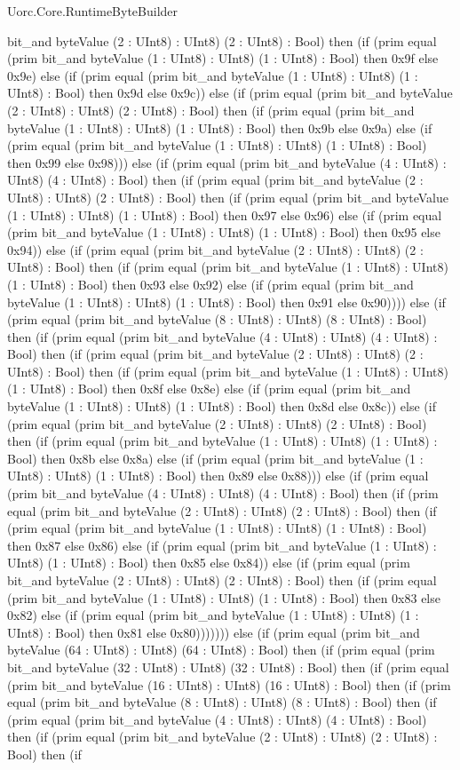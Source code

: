 \begin{lexlean}{Uorc.Core.RuntimeByteBuilder}
\begin{semanticmodule}
{bit_and byteValue (2 : UInt8) : UInt8) (2 : UInt8) : Bool) then (if (prim equal (prim bit_and byteValue (1 : UInt8) : UInt8) (1 : UInt8) : Bool) then 0x9f else 0x9e) else (if (prim equal (prim bit_and byteValue (1 : UInt8) : UInt8) (1 : UInt8) : Bool) then 0x9d else 0x9c)) else (if (prim equal (prim bit_and byteValue (2 : UInt8) : UInt8) (2 : UInt8) : Bool) then (if (prim equal (prim bit_and byteValue (1 : UInt8) : UInt8) (1 : UInt8) : Bool) then 0x9b else 0x9a) else (if (prim equal (prim bit_and byteValue (1 : UInt8) : UInt8) (1 : UInt8) : Bool) then 0x99 else 0x98))) else (if (prim equal (prim bit_and byteValue (4 : UInt8) : UInt8) (4 : UInt8) : Bool) then (if (prim equal (prim bit_and byteValue (2 : UInt8) : UInt8) (2 : UInt8) : Bool) then (if (prim equal (prim bit_and byteValue (1 : UInt8) : UInt8) (1 : UInt8) : Bool) then 0x97 else 0x96) else (if (prim equal (prim bit_and byteValue (1 : UInt8) : UInt8) (1 : UInt8) : Bool) then 0x95 else 0x94)) else (if (prim equal (prim bit_and byteValue (2 : UInt8) : UInt8) (2 : UInt8) : Bool) then (if (prim equal (prim bit_and byteValue (1 : UInt8) : UInt8) (1 : UInt8) : Bool) then 0x93 else 0x92) else (if (prim equal (prim bit_and byteValue (1 : UInt8) : UInt8) (1 : UInt8) : Bool) then 0x91 else 0x90)))) else (if (prim equal (prim bit_and byteValue (8 : UInt8) : UInt8) (8 : UInt8) : Bool) then (if (prim equal (prim bit_and byteValue (4 : UInt8) : UInt8) (4 : UInt8) : Bool) then (if (prim equal (prim bit_and byteValue (2 : UInt8) : UInt8) (2 : UInt8) : Bool) then (if (prim equal (prim bit_and byteValue (1 : UInt8) : UInt8) (1 : UInt8) : Bool) then 0x8f else 0x8e) else (if (prim equal (prim bit_and byteValue (1 : UInt8) : UInt8) (1 : UInt8) : Bool) then 0x8d else 0x8c)) else (if (prim equal (prim bit_and byteValue (2 : UInt8) : UInt8) (2 : UInt8) : Bool) then (if (prim equal (prim bit_and byteValue (1 : UInt8) : UInt8) (1 : UInt8) : Bool) then 0x8b else 0x8a) else (if (prim equal (prim bit_and byteValue (1 : UInt8) : UInt8) (1 : UInt8) : Bool) then 0x89 else 0x88))) else (if (prim equal (prim bit_and byteValue (4 : UInt8) : UInt8) (4 : UInt8) : Bool) then (if (prim equal (prim bit_and byteValue (2 : UInt8) : UInt8) (2 : UInt8) : Bool) then (if (prim equal (prim bit_and byteValue (1 : UInt8) : UInt8) (1 : UInt8) : Bool) then 0x87 else 0x86) else (if (prim equal (prim bit_and byteValue (1 : UInt8) : UInt8) (1 : UInt8) : Bool) then 0x85 else 0x84)) else (if (prim equal (prim bit_and byteValue (2 : UInt8) : UInt8) (2 : UInt8) : Bool) then (if (prim equal (prim bit_and byteValue (1 : UInt8) : UInt8) (1 : UInt8) : Bool) then 0x83 else 0x82) else (if (prim equal (prim bit_and byteValue (1 : UInt8) : UInt8) (1 : UInt8) : Bool) then 0x81 else 0x80))))))) else (if (prim equal (prim bit_and byteValue (64 : UInt8) : UInt8) (64 : UInt8) : Bool) then (if (prim equal (prim bit_and byteValue (32 : UInt8) : UInt8) (32 : UInt8) : Bool) then (if (prim equal (prim bit_and byteValue (16 : UInt8) : UInt8) (16 : UInt8) : Bool) then (if (prim equal (prim bit_and byteValue (8 : UInt8) : UInt8) (8 : UInt8) : Bool) then (if (prim equal (prim bit_and byteValue (4 : UInt8) : UInt8) (4 : UInt8) : Bool) then (if (prim equal (prim bit_and byteValue (2 : UInt8) : UInt8) (2 : UInt8) : Bool) then (if }
\end{semanticmodule}
\end{lexlean}
